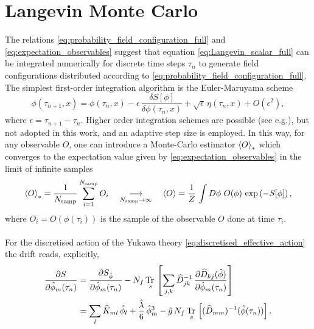 \section{Langevin Monte Carlo}
\label{sec:langevin_monte_carlo}
The relations \eqref{eq:probability_field_configuration_full} and \eqref{eq:expectation_observables} suggest that equation \eqref{eq:Langevin_scalar_full} can be integrated numerically for discrete time steps $\tau_n$ to generate field configurations distributed according to \eqref{eq:probability_field_configuration_full}. 
The simplest first-order integration algorithm is the Euler-Maruyama scheme \cite{ParisiWu}
\begin{equation*}
    \phi(\tau_{n+1}, x) = \phi(\tau_{n}, x) - \epsilon \,  \frac{\delta S[\phi]}{\delta \phi (\tau_n, x)} + \sqrt{\epsilon} \, \eta(\tau_n, x) + O(\epsilon^2),
\end{equation*}
where $\epsilon = \tau_{n+1} - \tau_n$. Higher order integration schemes are possible (see e.g.\cite{bilinearnoise1,Kronfeld1993}), but not adopted in this work, and an adaptive step size is employed.
In this way, for any observable $O$, one can introduce a Monte-Carlo estimator $\left\langle O \right\rangle_*$ which converges to the expectation value given by \eqref{eq:expectation_observables} in the limit of infinite samples
\begin{equation}
    \expect{O}_{*} = \frac{1}{N_\text{samp}} \sum^{N_\text{samp}}_{i=1} O_i \quad \underset{N_\text{samp} \to \infty}{\longrightarrow} \quad \expect{O} = \frac{1}{Z} \, \int D\phi \ O(\phi) \, \exp\left(-S[\phi]\right),
    \label{eq:monte_carlo_estimator}
\end{equation}
where $O_i = O(\phi(\tau_i))$ is the sample of the observable $O$ done at time $\tau_i$. \\~\\
For the discretised action of the Yukawa theory \eqref{eq:discretised_effective_action} the drift reads, explicitly,
\begin{equation}
    \begin{aligned}
        \frac{\partial S}{\partial \hat{\phi}_m(\tau_n)} &= \frac{\partial S_{\hat{\phi}}}{\partial \hat{\phi}_m(\tau_n)} - N_f \, \underset{s}{\operatorname{\text{Tr} \,}} \left[\sum_{j,k} \widehat{D}^{-1}_{jk}  \, \frac{\partial \widehat{D}_{kj}(\hat{\phi})}{\partial \hat{\phi}_m(\tau_n)}\right] \\
        &= \sum_l \widehat{K}_{ml} \, \hat\phi_l + \frac{\hat\lambda}{6} \, \hat\phi_m^3 - \hat g \, N_f \, \underset{s}{\operatorname{\text{Tr} \,}} \left[(\widehat{D}_{mm})^{-1}(\hat{\phi}(\tau_n))\right].
    \end{aligned}
    \label{eq:drift_continuum_full_theory}
\end{equation}
